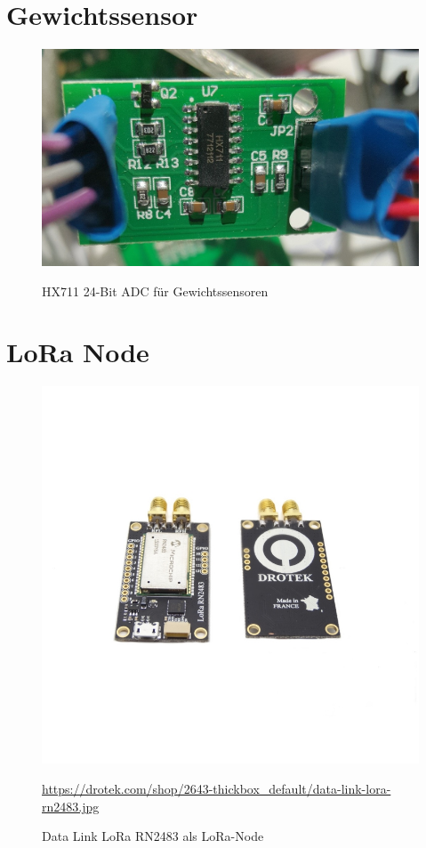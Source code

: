 \section{Gewichtssensor}
\begin{figure}[ht]
    \center
    \includegraphics[width=14cm]{Bilder/gewichtssensor.jpg}\\
    \caption{HX711 24-Bit ADC für Gewichtssensoren}
    \label{fig:Gewichtssensor}
\end{figure}
\newpage
\section{LoRa Node}
\begin{figure}[ht]
    \center
    \includegraphics[width=14cm]{Bilder/lora-node.jpg}\\
    \caption{Data Link LoRa RN2483 als LoRa-Node}
    \begin{flushleft}
        \quelle\url{https://drotek.com/shop/2643-thickbox_default/data-link-lora-rn2483.jpg}
    \end{flushleft}
    \label{fig:Lora-Node}
\end{figure}

